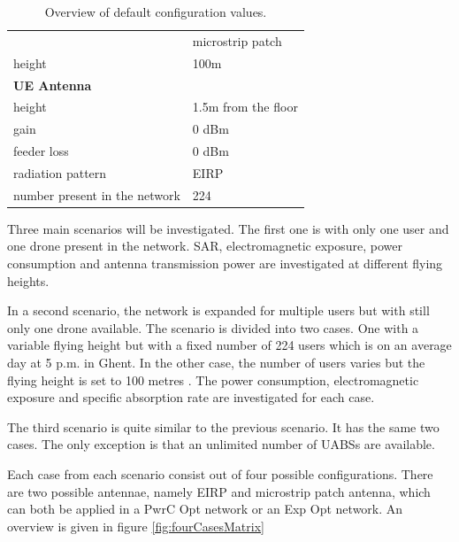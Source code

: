 \documentclass[twocolumn]{phdsymp} %
\begin{document}
\begin{table}[!htb]
\begin{tabular}[t]{ll}
         \hspace{3mm}                           & microstrip patch\\
        \hspace{3mm}  height                    & 100m  \\
        \hline
        \multicolumn{2}{l}{\textbf{UE Antenna}} \\
        \hline 
        \hspace{3mm} height                     & 1.5m from the floor       \\ 
        \hspace{3mm} gain                      & 0 dBm   \\ 
        \hspace{3mm} feeder loss               & 0 dBm   \\ 
        \hspace{3mm} radiation pattern         & EIRP  \\
        \hspace{3mm} number present in the network         & 224  \\
        \toprule
\end{tabular}
\caption{Overview of default configuration values.}
\label{table:defaultconf}
\end{table}

Three main scenarios will be investigated. 
The first one is with only one user and one drone present in the network. 
SAR, electromagnetic exposure, power consumption 
and antenna transmission power are investigated at different flying heights.

In a second scenario, the network is expanded for multiple users but with still only one drone available. 
The scenario is divided into two cases. One with a variable flying height but with a fixed 
number of 224 users which is on an average day 
at 5 p.m. in Ghent. In the other case, the number of users varies but the flying height is set to 100 metres \cite{J2}.
The power consumption, electromagnetic exposure and specific 
absorption rate are investigated for each case.

The third scenario is quite similar to the previous scenario. It has the same 
two cases. The only exception is that an unlimited number of \gls{UABS}s are available.

Each case from each scenario consist out of four possible configurations.
There are two possible antennae, namely EIRP 
and microstrip patch antenna, which can both be applied in a \gls{PwrC Opt} network or an \gls{Exp Opt} network.
An overview is given in figure \ref{fig:fourCasesMatrix}
\end{document}
